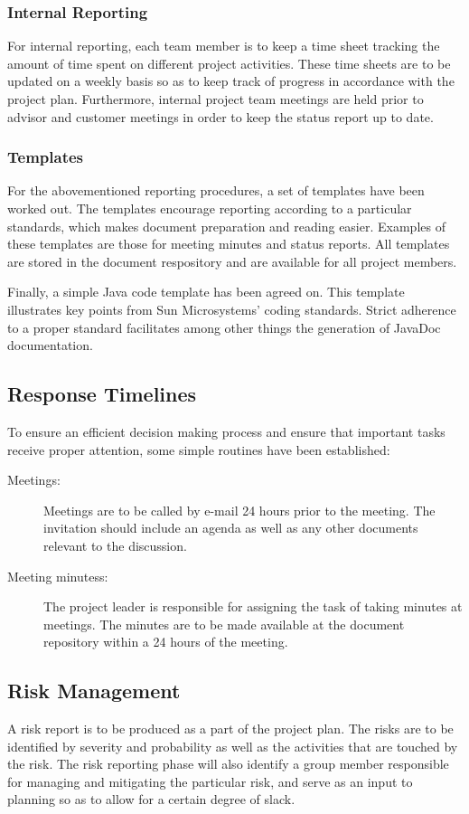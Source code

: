 \subsubsection{Internal Reporting}
For internal reporting, each team member is to keep a time sheet tracking the amount of time spent on different project activities. These time sheets are to be updated on a weekly basis so as to keep track of progress in accordance with the project plan. Furthermore, internal project team meetings are held prior to advisor and customer meetings in order to keep the status report up to date.

\subsubsection{Templates}
For the abovementioned reporting procedures, a set of templates have been worked out. The templates encourage reporting according to a particular standards, which makes document preparation and reading easier. Examples of these templates are those for meeting minutes and status reports. All templates are stored in the document respository and are available for all project members.

Finally, a simple Java code template has been agreed on. This template illustrates key points from Sun Microsystems' coding standards. Strict adherence to a proper standard facilitates among other things the generation of JavaDoc documentation.

\subsection{Response Timelines}
To ensure an efficient decision making process and ensure that important tasks receive proper attention, some simple routines have been established:
\begin{description}
\item[Meetings:] Meetings are to be called by e-mail 24 hours prior to the meeting. The invitation should include an agenda as well as any other documents relevant to the discussion.
\item[Meeting minutess:] The project leader is responsible for assigning the task of taking minutes at meetings. The minutes are to be made available at the document repository within a 24 hours of the meeting.
\end{description}

\subsection{Risk Management}
A risk report is to be produced as a part of the project plan. The risks are to be identified by severity and probability as well as the activities that are touched by the risk. The risk reporting phase will also identify a group member responsible for managing and mitigating the particular risk, and serve as an input to planning so as to allow for a certain degree of slack.

